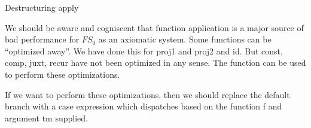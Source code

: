 \LA{}Destructuring \code{}apply\edoc{}~{\nwtagstyle{}}\RA{}
\eatline
{}\nwendcode{}\nwdocspar
\begin{node}
We should be aware and cogniscent that function application is a major
source of bad performance for $FS_{0}$ as an axiomatic system. Some
functions can be ``optimized away''. We have done this for {\Tt{}proj1\nwendquote}
and {\Tt{}proj2\nwendquote} and {\Tt{}id\nwendquote}. But {\Tt{}const\nwendquote}, {\Tt{}comp\nwendquote}, {\Tt{}juxt\nwendquote}, {\Tt{}recur\nwendquote}
have not been optimized in any sense. The {\Tt{}\nwendquote} function can be
used to perform these optimizations.

If we want to perform these optimizations, then we should replace the
default branch with a {\Tt{}case\nwendquote} expression which dispatches based on
the function {\Tt{}f\nwendquote} and argument {\Tt{}tm\nwendquote} supplied.
\end{node}


